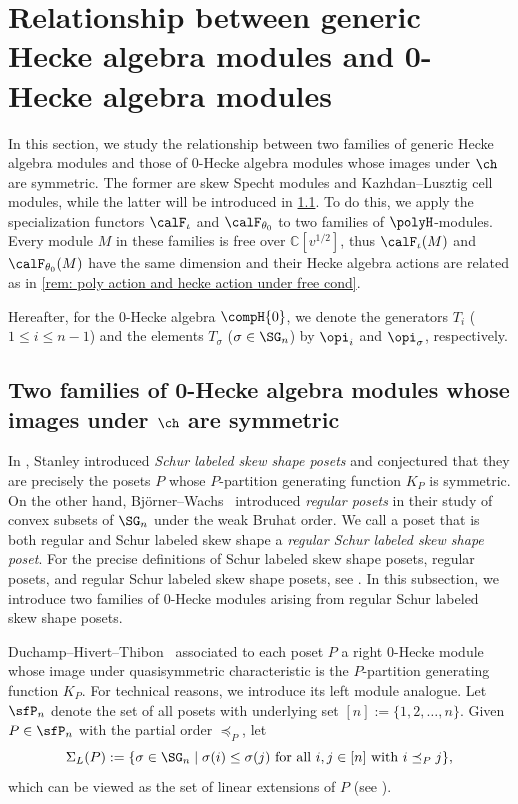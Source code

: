 \documentclass[12pt, reqno]{amsart}
\theoremstyle{plain}
\theoremstyle{definition}
\numberwithin{equation}{section}
\numberwithin{figure}{section}
\numberwithin{table}{section}
\def\C{\mathbb C}
\begin{document}
\section{Relationship between  generic Hecke algebra modules and 0-Hecke algebra modules}\label{sec: 0-Hecke modules from specializations}

In this section, we study the relationship between two families of generic Hecke algebra modules and  those of $0$-Hecke algebra modules whose images under $\ch$ are symmetric.
The former are skew Specht modules and Kazhdan--Lusztig cell modules, while the latter will be introduced in \cref{subsec: two kinds of notable 0 Hecke modules}.
To do this, we apply the specialization functors $\calF_\iota$ and $\calF_{\theta_0}$ to two families of $\polyH$-modules.
Every module $M$ in these families is free over $\C[v^{1/2}]$, thus $\calF_\iota(M)$ and $\calF_{\theta_0}(M)$ have the same dimension and their Hecke algebra actions are related as in \cref{rem: poly action and hecke action under free cond}.


Hereafter, for the $0$-Hecke algebra $\compH{0}$, we denote the generators $T_i$ ($1 \leq i \leq n-1$) and the elements $T_\sigma$ ($\sigma \in \SG_n$) by $\opi_i$ and $\opi_\sigma$, respectively.


\subsection{Two families of 0-Hecke algebra modules whose images under \texorpdfstring{$\ch$}{ch} are symmetric}\label{subsec: two kinds of notable 0 Hecke modules}

In \cite{72Stanley}, Stanley  introduced \emph{Schur labeled skew shape posets} and conjectured that they are precisely the posets $P$ whose $P$-partition generating function $K_P$ is symmetric.
On the other hand, Bj\"orner--Wachs~\cite{91BW} introduced \emph{regular posets}  in their study of convex subsets of $\SG_{n}$ under the weak Bruhat order. 
We call a poset that is both regular and Schur labeled skew shape a \emph{regular Schur labeled skew shape poset}.
For the precise definitions of Schur labeled skew shape posets, regular posets, and regular Schur labeled skew shape posets, see \cite[Section~2.3]{23KLO}.
In this subsection, we introduce two families of $0$-Hecke modules arising from regular Schur labeled skew shape posets.

Duchamp--Hivert--Thibon~\cite{02DHT} associated to each poset $P$ a right $0$-Hecke module whose image under quasisymmetric characteristic is the $P$-partition generating function $K_P$.
For technical reasons, we introduce its left module analogue.
Let $\sfP_n$ denote the set of all posets with underlying set $[n] := \{1,2,\ldots,n\}$.
Given $P \in \sfP_n$ with the partial order $\preceq_P$, 
let
\[
\Sigma_{L}(P) := \{\sigma \in \SG_n \mid \text{$\sigma(i) \leq \sigma(j)$ for all $i, j\in [n]$ with $i \preceq_P j$}\},
\]
which can be viewed as the set of  linear extensions of $P$ (see \cite[Subsection 2.3]{23KLO}).
\end{document}
